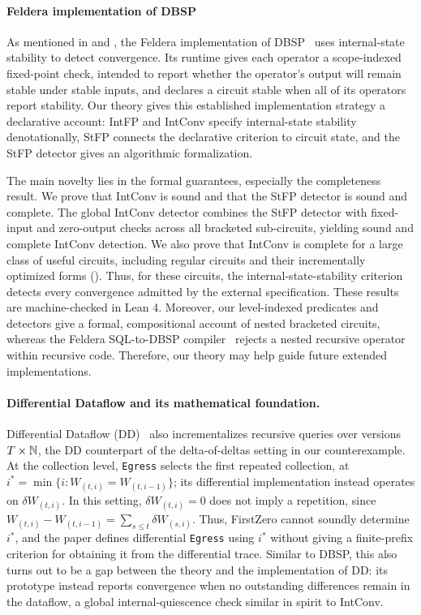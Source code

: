 %
%
%
%
%
%

%
%
%
%
%



\paragraph{Feldera implementation of DBSP}
As mentioned in  and , the Feldera implementation of DBSP~\cite{feldera_repo} uses internal-state stability to detect convergence. Its runtime gives each operator a scope-indexed fixed-point check, intended to report whether the operator's output will remain stable under stable inputs, and declares a circuit stable when all of its operators report stability. Our theory gives this established implementation strategy a declarative account: IntFP and IntConv specify internal-state stability denotationally, StFP connects the declarative criterion to circuit state, and the StFP detector gives an algorithmic formalization.

The main novelty lies in the formal guarantees, especially the completeness result. We prove that IntConv is sound and that the StFP detector is sound and complete. The global IntConv detector combines the StFP detector with fixed-input and zero-output checks across all bracketed sub-circuits, yielding sound and complete IntConv detection. We also prove that IntConv is complete for a large class of useful circuits, including regular circuits and their incrementally optimized forms (). Thus, for these circuits, the internal-state-stability criterion detects every convergence admitted by the external specification. These results are machine-checked in Lean 4. Moreover, our level-indexed predicates and detectors give a formal, compositional account of nested bracketed circuits, whereas the Feldera SQL-to-DBSP compiler~\cite{feldera_repo} rejects a nested recursive operator within recursive code. Therefore, our theory may help guide future extended implementations.

\paragraph{Differential Dataflow and its mathematical foundation.}

Differential Dataflow (DD)~\cite{McSherry2013DifferentialD} also incrementalizes recursive queries over versions $T \times \mathbb{N}$, the DD counterpart of the delta-of-deltas setting in our counterexample. At the collection level, \texttt{Egress} selects the first repeated collection, at $i^* = \min\{i : W_{(t,i)} = W_{(t,i-1)}\}$; its differential implementation instead operates on $\delta W_{(t,i)}$. In this setting, $\delta W_{(t,i)}=0$ does not imply a repetition, since $W_{(t,i)}-W_{(t,i-1)}=\sum_{s\leq t}\delta W_{(s,i)}$. Thus, FirstZero cannot soundly determine $i^*$, and the paper defines differential \texttt{Egress} using $i^*$ without giving a finite-prefix criterion for obtaining it from the differential trace. Similar to DBSP, this also turns out to be a gap between the theory and the implementation of DD: its prototype instead reports convergence when no outstanding differences remain in the dataflow, a global internal-quiescence check similar in spirit to IntConv.

